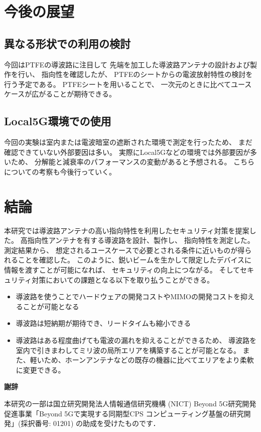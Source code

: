 \documentclass[technicalreport]{ieicej}
\begin{document}
\section{今後の展望}

\subsection{異なる形状での利用の検討}

今回はPTFEの導波路に注目して
先端を加工した導波路アンテナの設計および製作を行い、
指向性を確認したが、
PTFEのシートからの電波放射特性の検討を行う予定である。
PTFEシートを用いることで、
一次元のときに比べてユースケースが広がることが期待できる。

\subsection{Local5G環境での使用}

今回の実験は室内または電波暗室の遮断された環境で測定を行ったため、
まだ確認できていない外部要因は多い。
実際にLocal5Gなどの環境では外部要因が多いため、
分解能と減衰率のパフォーマンスの変動があると予想される。
こちらについての考察も今後行っていく。

\section{結論}

本研究では導波路アンテナの高い指向特性を利用したセキュリティ対策を提案した。
高指向性アンテナを有する導波路を設計、製作し、
指向特性を測定した。
測定結果から、
想定されるユースケースで必要とされる条件に近いものが得られることを確認した。
このように、鋭いビームを生かして限定したデバイスに情報を渡すことが可能になれば、
セキュリティの向上につながる。
そしてセキュリティ対策においての課題となる以下を取り払うことができる。

\begin{itemize}
  \item 導波路を使うことでハードウェアの開発コストやMIMOの開発コストを抑えることが可能となる
  \item 導波路は短納期が期待でき、リードタイムも縮小できる
  \item 導波路はある程度曲げても電波の漏れを抑えることができるため、
  導波路を室内で引きまわしてミリ波の局所エリアを構築することが可能となる。
  また、軽いため、ホーンアンテナなどの既存の機器に比べてエリアをより柔軟に変更できる。
\end{itemize}

\begin{center}
  \Large \textbf{謝辞}
\end{center}

本研究の一部は国立研究開発法人情報通信研究機構 (NICT) 
Beyond 5G研究開発促進事業「Beyond 5Gで実現する同期型CPS
コンピューティング基盤の研究開発」(採択番号: 01201) の助成を受けたものです．

%
%

\end{document}
